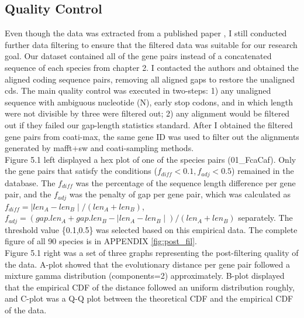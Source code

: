 \subsection{Quality Control}
Even though the data was extracted from a published paper \parencite{zou2021nonsynonymous}, I still conducted further data filtering to ensure that the filtered data was suitable for our research goal. Our dataset contained all of the gene pairs instead of a concatenated sequence of each species from chapter 2. I contacted the authors and obtained the aligned coding sequence pairs, removing all aligned gaps to restore the unaligned cds. The main quality control was executed in two-steps: 1) any unaligned sequence with ambiguous nucleotide (N), early stop codons, and in which length were not divisible by three were filtered out; 2) any alignment would be filtered out if they failed our gap-length statistics standard. After I obtained the filtered gene pairs from coati-max, the same gene ID was used to filter out the alignments generated by mafft+sw and coati-sampling methods. \\
\indent Figure 5.1 left displayed a hex plot of one of the species pairs (01\_FcaCaf). Only the gene pairs that satisfy the conditions ($f_{diff}<0.1, f_{adj}<0.5$) remained in the database. The $f_{diff}$ was the percentage of the sequence length difference per gene pair, and the $f_{adj}$ was the penalty of gap per gene pair, which was calculated as $f_{diff} = \mid len_A-len_B \mid/(len_A+len_B)$,  $f_{adj} = (gap.len_A+gap.len_B - \mid len_A-len_B \mid)/(len_A+len_B) $ separately. The threshold value \{0.1,0.5\} was selected based on this empirical data. The complete figure of all 90 species is in APPENDIX \ref{fig:post_fil}. \\ 
\indent Figure 5.1 right was a set of three graphs representing the post-filtering quality of the data. A-plot showed that the evolutionary distance \parencite{erickson2010jukes} per gene pair followed a mixture gamma distribution (components=2) approximately. B-plot displayed that the empirical CDF of the distance followed an uniform distribution roughly, and C-plot was a Q-Q plot between the theoretical CDF and the empirical CDF of the data. 

